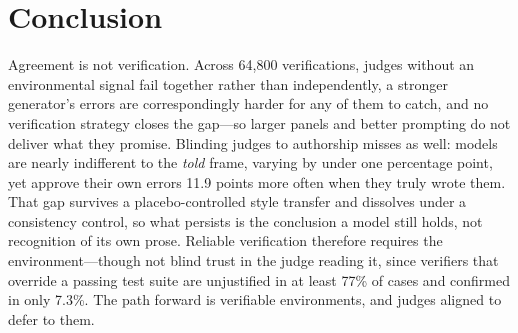 \documentclass{article}
\begin{document}
\section{Conclusion}
\label{sec:conclusion}

Agreement is not verification. Across 64{,}800 verifications, judges without an
environmental signal fail together rather than independently, a stronger generator's errors
are correspondingly harder for any of them to catch, and no verification strategy closes
the gap---so larger panels and better prompting do not deliver what they promise. Blinding
judges to authorship misses as well: models are nearly indifferent to the \emph{told} frame,
varying by under one percentage point, yet approve their own errors 11.9 points more often
when they truly wrote them. That gap survives a placebo-controlled style transfer and
dissolves under a consistency control, so what persists is the conclusion a model still
holds, not recognition of its own prose. Reliable verification therefore requires the
environment---though not blind trust in the judge reading it, since verifiers that override
a passing test suite are unjustified in at least 77\% of cases and confirmed in only 7.3\%.
The path forward is verifiable environments, and judges aligned to defer to them.
\FloatBarrier
\end{document}
